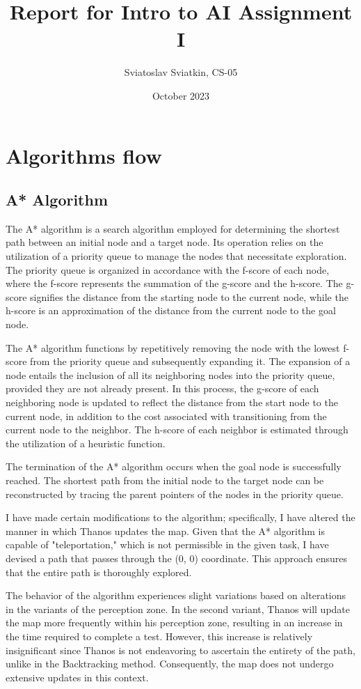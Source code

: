 \documentclass{article}
\title{Report for Intro to AI Assignment I}
\author{Sviatoslav Sviatkin, CS-05}
\date{October 2023}
\begin{document}
\maketitle


\section*{Algorithms flow}

\subsection*{A* Algorithm}

The A* algorithm is a search algorithm employed for determining the shortest path between an initial node and a target node. Its operation relies on the utilization of a priority queue to manage the nodes that necessitate exploration. The priority queue is organized in accordance with the f-score of each node, where the f-score represents the summation of the g-score and the h-score. The g-score signifies the distance from the starting node to the current node, while the h-score is an approximation of the distance from the current node to the goal node.

The A* algorithm functions by repetitively removing the node with the lowest f-score from the priority queue and subsequently expanding it. The expansion of a node entails the inclusion of all its neighboring nodes into the priority queue, provided they are not already present. In this process, the g-score of each neighboring node is updated to reflect the distance from the start node to the current node, in addition to the cost associated with transitioning from the current node to the neighbor. The h-score of each neighbor is estimated through the utilization of a heuristic function.

The termination of the A* algorithm occurs when the goal node is successfully reached. The shortest path from the initial node to the target node can be reconstructed by tracing the parent pointers of the nodes in the priority queue.

I have made certain modifications to the algorithm; specifically, I have altered the manner in which Thanos updates the map. Given that the A* algorithm is capable of "teleportation," which is not permissible in the given task, I have devised a path that passes through the (0, 0) coordinate. This approach ensures that the entire path is thoroughly explored.

The behavior of the algorithm experiences slight variations based on alterations in the variants of the perception zone. In the second variant, Thanos will update the map more frequently within his perception zone, resulting in an increase in the time required to complete a test. However, this increase is relatively insignificant since Thanos is not endeavoring to ascertain the entirety of the path, unlike in the Backtracking method. Consequently, the map does not undergo extensive updates in this context.
\end{document}
